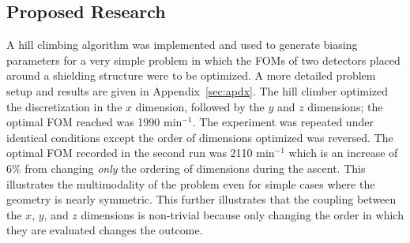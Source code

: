 \documentclass{article}
\begin{document}










\subsection{Proposed Research}\label{sec:b3}
A hill climbing algorithm was implemented and used to generate biasing parameters for a very simple problem in which the FOMs of two detectors placed around a shielding structure were to be optimized. A more detailed problem setup and results are given in Appendix~\ref{sec:apdx}. The hill climber optimized the discretization in the $x$ dimension, followed by the $y$ and $z$ dimensions; the optimal FOM reached was 1990 min$^{-1}$. The experiment was repeated under identical conditions except the order of dimensions optimized was reversed. The optimal FOM recorded in the second run was 2110 min$^{-1}$ which is an increase of 6\% from changing \textit{only} the ordering of dimensions during the ascent. This illustrates the multimodality of the problem even for simple cases where the geometry is nearly symmetric. This further illustrates that the coupling between the $x$, $y$, and $z$ dimensions is non-trivial because only changing the order in which they are evaluated changes the outcome.
\end{document}
